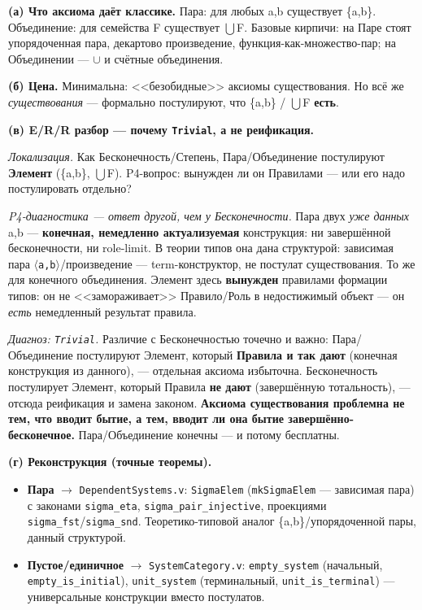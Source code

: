 \documentclass[11pt,a4paper]{article}
\begin{document}
\textbf{(а) Что аксиома даёт классике.} Пара: для любых a,b существует \{a,b\}. Объединение: для семейства F существует $\bigcup$F. Базовые кирпичи: на Паре стоят упорядоченная пара, декартово произведение, функция-как-множество-пар; на Объединении --- $\cup$ и счётные объединения.

\textbf{(б) Цена.} Минимальна: <<безобидные>> аксиомы существования. Но всё же \emph{существования} --- формально постулируют, что \{a,b\} / $\bigcup$F \textbf{есть}.

\textbf{(в) E/R/R разбор --- почему \texttt{Trivial}, а не реификация.}

\emph{Локализация.} Как Бесконечность/Степень, Пара/Объединение постулируют \textbf{Элемент} (\{a,b\}, $\bigcup$F). P4-вопрос: вынужден ли он Правилами --- или его надо постулировать отдельно?

\emph{P4-диагностика --- ответ другой, чем у Бесконечности.} Пара двух \emph{уже данных} a,b --- \textbf{конечная, немедленно актуализуемая} конструкция: ни завершённой бесконечности, ни role-limit. В теории типов она дана структурой: зависимая пара \texttt{$\langle$a,\allowbreak{}b$\rangle$}/произведение --- term-конструктор, не постулат существования. То же для конечного объединения. Элемент здесь \textbf{вынужден} правилами формации типов: он не <<замораживает>> Правило/Роль в недостижимый объект --- он \emph{есть} немедленный результат правила.

\emph{Диагноз: \texttt{Trivial}.} Различие с Бесконечностью точечно и важно: Пара/Объединение постулируют Элемент, который \textbf{Правила и так дают} (конечная конструкция из данного), --- отдельная аксиома избыточна. Бесконечность постулирует Элемент, который Правила \textbf{не дают} (завершённую тотальность), --- отсюда реификация и замена законом. \textbf{Аксиома существования проблемна не тем, что вводит бытие, а тем, вводит ли она бытие завершённо-бесконечное.} Пара/Объединение конечны --- и потому бесплатны.

\textbf{(г) Реконструкция (точные теоремы).}
\begin{itemize}
\item \textbf{Пара} $\to$ \texttt{Dependent\allowbreak{}Systems.v}: \texttt{Sigma\allowbreak{}Elem} (\texttt{mk\allowbreak{}Sigma\allowbreak{}Elem} --- зависимая пара) с законами \texttt{sigma\_\allowbreak{}eta}, \texttt{sigma\_\allowbreak{}pair\_\allowbreak{}injective}, проекциями \texttt{sigma\_\allowbreak{}fst}/\texttt{sigma\_\allowbreak{}snd}. Теоретико-типовой аналог \{a,b\}/упорядоченной пары, данный структурой.
\item \textbf{Пустое/единичное} $\to$ \texttt{System\allowbreak{}Category.v}: \texttt{empty\_\allowbreak{}system} (начальный, \texttt{empty\_\allowbreak{}is\_\allowbreak{}initial}), \texttt{unit\_\allowbreak{}system} (терминальный, \texttt{unit\_\allowbreak{}is\_\allowbreak{}terminal}) --- универсальные конструкции вместо постулатов.
\end{itemize}
\end{document}
